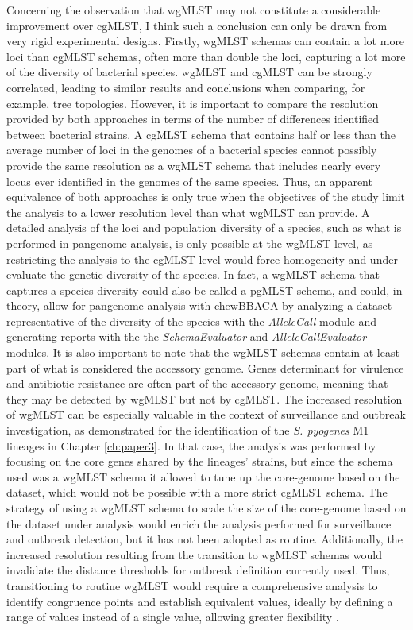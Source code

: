 Concerning the observation that wgMLST may not constitute a considerable improvement over \ac{cgMLST}, I think such a conclusion can only be drawn from very rigid experimental designs. Firstly, \ac{wgMLST} schemas can contain a lot more loci than cgMLST schemas, often more than double the loci, capturing a lot more of the diversity of bacterial species. \ac{wgMLST} and cgMLST can be strongly correlated, leading to similar results and conclusions when comparing, for example, tree topologies. However, it is important to compare the resolution provided by both approaches in terms of the number of differences identified between bacterial strains. A cgMLST schema that contains half or less than the average number of loci in the genomes of a bacterial species cannot possibly provide the same resolution as a wgMLST schema that includes nearly every locus ever identified in the genomes of the same species. Thus, an apparent equivalence of both approaches is only true when the objectives of the study limit the analysis to a lower resolution level than what wgMLST can provide. A detailed analysis of the loci and population diversity of a species, such as what is performed in pangenome analysis, is only possible at the wgMLST level, as restricting the analysis to the cgMLST level would force homogeneity and under-evaluate the genetic diversity of the species. In fact, a wgMLST schema that captures a species diversity could also be called a \ac{pgMLST} schema, and could, in theory, allow for pangenome analysis with chewBBACA by analyzing a dataset representative of the diversity of the species with the \textit{AlleleCall} module and generating reports with the the \textit{SchemaEvaluator} and \textit{AlleleCallEvaluator} modules. It is also important to note that the wgMLST schemas contain at least part of what is considered the accessory genome. Genes determinant for virulence and antibiotic resistance are often part of the accessory genome, meaning that they may be detected by wgMLST but not by cgMLST. The increased resolution of wgMLST can be especially valuable in the context of surveillance and outbreak investigation, as demonstrated for the identification of the \textit{S. pyogenes} M1 lineages in Chapter \ref{ch:paper3}. In that case, the analysis was performed by focusing on the core genes shared by the lineages' strains, but since the schema used was a wgMLST schema it allowed to tune up the core-genome based on the dataset, which would not be possible with a more strict cgMLST schema. The strategy of using a wgMLST schema to scale the size of the core-genome based on the dataset under analysis would enrich the analysis performed for surveillance and outbreak detection, but it has not been adopted as routine. Additionally, the increased resolution resulting from the transition to wgMLST schemas would invalidate the distance thresholds for outbreak definition currently used. Thus, transitioning to routine wgMLST would require a comprehensive analysis to identify congruence points and establish equivalent values, ideally by defining a range of values instead of a single value, allowing greater flexibility \cite{mixao_multi-country_2025}.

